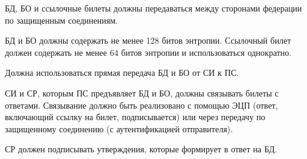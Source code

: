 
БД, БО и ссылочные билеты должны передаваться между сторонами федерации по 
защищенным соединениям. 

БД и БО должны содержать не менее 128 битов энтропии.
% 
Ссылочный билет должен содержать не менее 64 битов энтропии 
и использоваться однократно.  

Должна использоваться прямая передача БД и БО от СИ к ПС.

СИ и СР, которым ПС предъявляет БД и БО, должны связывать билеты с ответами.
%
Связывание должно быть реализовано с помощью ЭЦП (ответ, включающий ссылку на 
билет, подписывается) или через передачу по защищенному соединению 
(с аутентификацией отправителя). 


СР должен подписывать утверждения, которые формирует в ответ на БД. 

